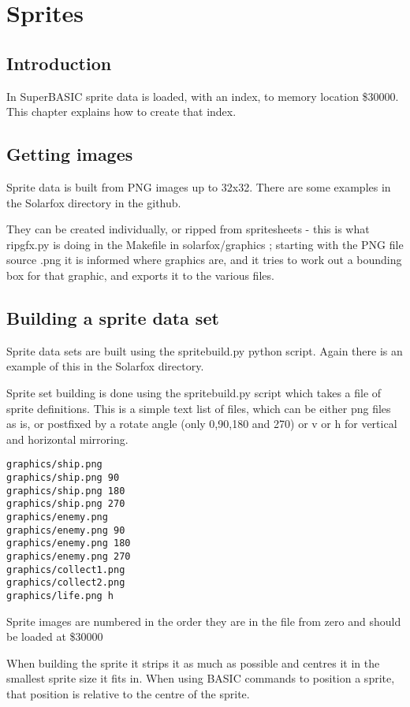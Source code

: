\chapter{Sprites}

\section{Introduction}

In SuperBASIC sprite data is loaded, with an index, to memory location \$30000. This chapter explains how to create that index.

\section{Getting images}

Sprite data is built from PNG images up to 32x32. There are some examples in the Solarfox directory in the github.

They can be created individually, or ripped from spritesheets - this is what ripgfx.py is doing in the Makefile in solarfox/graphics ; starting with the PNG file source .png it is informed where graphics are, and it tries to work out a bounding box for that graphic, and exports it to the various files.

\section{Building a sprite data set}
	
Sprite data sets are built using the spritebuild.py python script. Again there is an example of this in the Solarfox directory.

Sprite set building is done using the spritebuild.py script which takes a file of sprite definitions. This is a simple text list of files, which can be either png files as is, or postfixed by a rotate angle (only 0,90,180 and 270) or v or h for vertical and horizontal mirroring.

\begin{verbatim}
graphics/ship.png
graphics/ship.png 90
graphics/ship.png 180
graphics/ship.png 270
graphics/enemy.png
graphics/enemy.png 90
graphics/enemy.png 180
graphics/enemy.png 270
graphics/collect1.png
graphics/collect2.png
graphics/life.png h
\end{verbatim}

Sprite images are numbered in the order they are in the file from zero and should be loaded at \$30000

When building the sprite it strips it as much as possible and centres it in the smallest sprite size it fits in. When using BASIC commands to position a sprite, that position is relative to the centre of the sprite.

